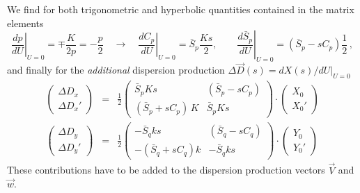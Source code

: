\documentclass[12pt]{article}
\begin{document}
We find for both trigonometric and hyperbolic quantities contained in the matrix elements
\[
\left. \frac{dp}{dU}\right|_{U=0}=\mp\frac{K}{2p} = -\frac{p}{2} \quad \longrightarrow\quad
\left. \frac{dC_p}{dU}\right|_{U=0}= \bar{S}_p \frac{K s}{2}, \qquad
\left. \frac{d\bar{S}_p}{dU}\right|_{U=0} = (\bar{S}_p-sC_p)\frac{1}{2}\, ,
\]
and finally for the {\em additional} dispersion production $\Delta \vec{D}(s)=dX(s)/dU|_{U=0}$
\begin{eqnarray}
\left( \begin{array}{c} \Delta D_x \\ \Delta D_x' \end{array} \right) & = &
\frac{1}{2} \left( \begin{array}{cc}
\bar{S}_p K s &  (\bar{S}_p-sC_p) \\
(\bar{S}_p+sC_p)\,K & \bar{S}_p K s
 \end{array} \right)\cdot \left(\begin{array}{c} X_0 \\ X_0' \end{array} \right)\\
\left( \begin{array}{c} \Delta D_y \\ \Delta D_y' \end{array} \right)& = &
\frac{1}{2} \left( \begin{array}{cc}
-\bar{S}_q k s & (\bar{S}_q-sC_q)  \\
-(\bar{S}_q+sC_q)k &  -  \bar{S}_q k s
 \end{array} \right)\cdot \left(\begin{array}{c} Y_0 \\ Y_0' \end{array}\right)
 \end{eqnarray}
These contributions have to be added to the dispersion production vectors $\vec{V}$ and $\vec{w}$.
\end{document}
